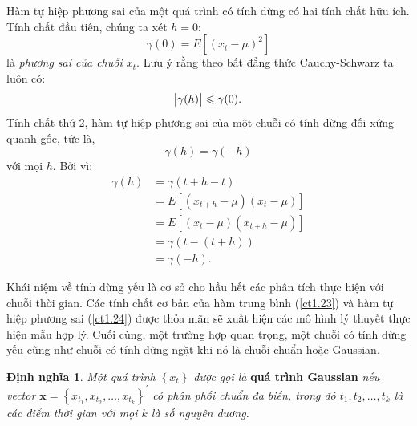 \documentclass[12pt, a4paper,oneside]{book}
\theoremstyle{definition}
\newtheorem{dn}[theo]{Định nghĩa}
\begin{document}
Hàm tự hiệp phương sai của một quá trình có tính dừng có hai tính chất hữu ích. Tính chất đầu tiên, chúng ta xét $h = 0$:
\begin{equation}
\gamma(0)=E[(x_{t}-\mu)^{2}] \label{ct1.26}
\end{equation}
là \textit{phương sai của chuỗi $x_{t}$}. Lưu ý rằng theo bất đẳng thức Cauchy-Schwarz ta luôn có:
\begin{equation}
\abs{\gamma(h)}\leqslant \gamma(0). \label{ct1.27}
\end{equation}
Tính chất thứ 2, hàm tự hiệp phương sai của một chuỗi có tính dừng đối xứng quanh gốc, tức là,
\begin{equation}
\gamma(h)=\gamma(-h) \label{ct1.28}
\end{equation}
với mọi $h$. Bởi vì:
\begin{align*}
\gamma(h)&=\gamma(t+h-t) \\
&=E[(x_{t+h}-\mu)(x_{t}-\mu)]\\
&=E[(x_{t}-\mu)(x_{t+h}-\mu)]\\
&=\gamma(t-(t+h))\\
&=\gamma(-h). 
\end{align*}

Khái niệm về tính dừng yếu là cơ sở cho hầu hết các phân tích thực hiện với chuỗi thời gian. Các tính chất cơ bản của hàm trung bình (\ref{ct1.23}) và hàm tự hiệp phương sai (\ref{ct1.24}) được thỏa mãn sẽ xuất hiện các mô hình lý thuyết thực hiện mẫu hợp lý. Cuối cùng, một trường hợp quan trọng, một chuỗi có tính dừng yếu cũng như chuỗi có tính dừng ngặt khi nó là chuỗi chuẩn hoặc Gaussian.
\begin{dn}\cite{1} \textit{Một quá trình $ \left\lbrace x_{t}\right\rbrace  $ được gọi là} \textbf{quá trình Gaussian} \textit{nếu vector $ \textbf{x}=\left\lbrace x_{t_{1}}, x_{t_{2}}, \dots, x_{t_{k}}\right\rbrace^{'} $ có phân phối chuẩn đa biến, trong đó $t_{1}, t_{2}, \dots, t_{k}$ là các điểm thời gian với mọi $k$ là số nguyên dương.}
\end{dn}
\end{document}
